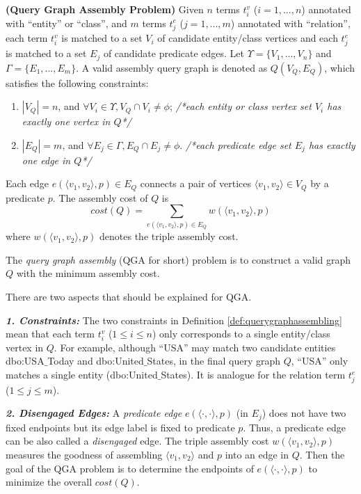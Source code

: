 \vspace{-0.05in}
\begin{definition} \textbf{(Query Graph Assembly Problem)}\label{def:querygraphassembling}
	Given $n$ terms $t^{v}_i$ ($i=1,...,n$) annotated with ``entity'' or ``class'', and $m$ terms $t_j^{e}$ ($j=1,...,m$) annotated with ``relation'', each term $t^{v}_i$ is matched to a set $V_i$ of candidate entity/class vertices and each $t^{e}_j$ is matched to a set $E_j$ of candidate predicate edges. Let $\Upsilon=\{V_1, ..., V_n\}$ and $\Gamma=\{E_1, ..., E_m\}$. A valid assembly query graph is denoted as $Q (V_Q,E_Q)$, which satisfies the following constraints:
	\begin{enumerate}
		\item $|V_Q|=n$, and $\forall V_i \in \Upsilon, V_Q \cap V_i \not= \phi$; 
		\emph{/*each entity or class vertex set $V_i$ has exactly one vertex in  $Q$*/}
		\item $|E_Q|=m$, and $\forall E_j \in \Gamma, E_Q \cap E_j \not= \phi$. 
		\emph{/*each predicate edge set $E_j$ has exactly one edge in $Q$*/}
	\end{enumerate}
	Each edge $e(\langle v_1, v_2\rangle,p) \in E_Q$ connects a pair of vertices $\langle v_1, v_2\rangle \in V_Q$ by a predicate $p$.
	The assembly cost of $Q$ is
	\begin{equation} \label{equ:cost}
	cost(Q)=\sum_{e(\langle v_1, v_2\rangle,p) \in E_Q}{w(\langle v_1, v_2\rangle,p)}
	\end{equation}
	where  $w(\langle v_1, v_2\rangle,p)$ denotes the triple assembly cost. 
	
	
	The \emph{query graph assembly} (QGA for short) problem is to construct a valid graph $Q$ with the minimum assembly cost. 
\end{definition} 


There are two aspects that should be explained for QGA.

\textbf{\emph{1. Constraints:}}
The two constraints in Definition \ref{def:querygraphassembling} mean that each term $t^{v}_i$ ($1\leq i \leq n$) only corresponds to a single entity/class vertex in $Q$. For example, although ``USA'' may match two candidate entities dbo:USA$\_$Today and dbo:United$\_$States, in the final query graph $Q$, ``USA'' only matches a single entity (dbo:United$\_$States). It is analogue for the relation term $t_j^{e}$ ($1\leq j \leq m$). 

\textbf{\emph{2. Disengaged Edges:}}
A \emph{predicate edge} $e(\langle \cdot,\cdot \rangle,p)$ (in $E_j$) does not have two fixed endpoints but its edge label is fixed to predicate $p$. Thus, a predicate edge can be also called a \emph{disengaged} edge. The triple assembly cost $w(\langle v_1, v_2\rangle,p)$ measures the goodness of assembling $\langle v_1, v_2\rangle$ and $p$ into an edge in $Q$. Then the goal of the QGA problem is to determine the endpoints of $e(\langle \cdot,\cdot \rangle,p)$ to minimize the overall $cost(Q)$.

